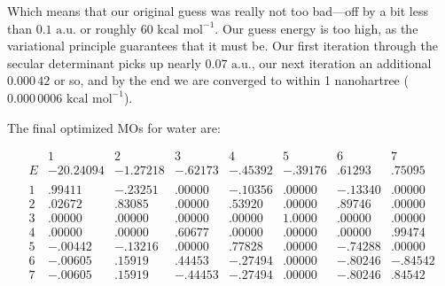 \documentclass[
  9pt,
]{extbook}
\theoremstyle{definition}
\theoremstyle{definition}
\theoremstyle{definition}
\theoremstyle{remark}
\begin{document}
Which means that our original guess was really not too bad---off by a bit less than \(0.1\text{ a.u.}\) or roughly \(60\text{ kcal mol}^{-1}\). Our guess energy is too high, as the variational principle guarantees that it must be. Our first iteration through the secular determinant picks up nearly \(0.07\text{ a.u.}\), our next iteration an additional \(0.000\,42\) or so, and by the end we are converged to within 1 nanohartree (\(0.000\,000 6\text{ kcal mol}^{-1}\)).

The final optimized MOs for water are:

\begin{equation}
\begin{matrix}                  
& 1 & 2 & 3 & 4 & 5 & 6 & 7 \\\
E  & -20.24094 &  -1.27218   &   -.62173    &  -.45392     &    -.39176    &   .61293    & .75095 \\\
\\\
1                & .99411    &   -.23251   &   .00000     &  -.10356     &    .00000     &   -.13340   & .00000   \\\
2                & .02672    &   .83085    &  .00000      & .53920       &  .00000      &  .89746     & .00000  \\\
3                & .00000    &   .00000    &  .00000      & .00000       &  1.0000       & .00000      & .00000  \\\
4                & .00000    &   .00000    & .60677       &  .00000      &   .00000      &  .00000     & .99474  \\\
5                & -.00442   &    -.13216  &    .00000    &   .77828     &    .00000     &  -.74288    &  .00000  \\\
6                & -.00605   &    .15919   &   .44453     &  -.27494     &    .00000     &  -.80246    &  -.84542  \\\
7                &  -.00605  &     .15919  &     -.44453  &     -.27494  &       .00000  &     -.80246 &     .84542 \\\
\end{matrix}
\label{eq:eigenvalMO}
\end{equation}
\end{document}
